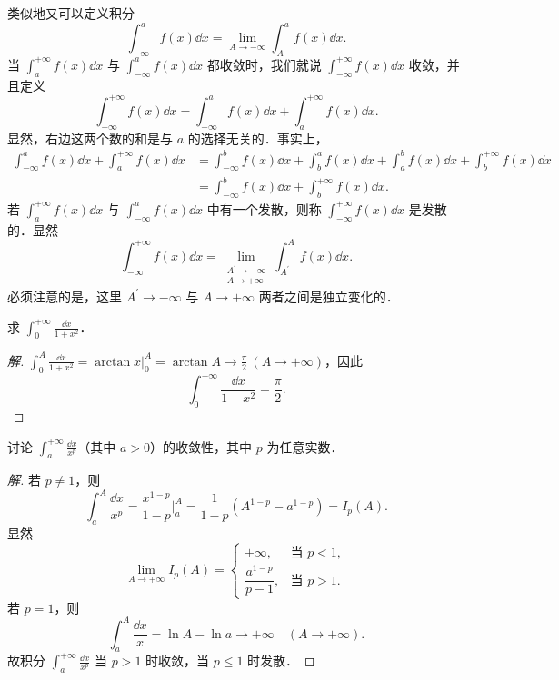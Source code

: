 类似地又可以定义积分
\[
\int_{-\infty}^{a}f(x)\dd x=\lim_{A\to-\infty}\int_{A}^{a}f(x)\dd x.
\]
当 $\displaystyle\int_{a}^{+\infty}f(x)\dd x$ 与 $\displaystyle\int_{-\infty}^{a}f(x)\dd x$ 都收敛时，我们就说 $\displaystyle\int_{-\infty}^{+\infty}f(x)\dd x$ 收敛，并且定义
\[
\int_{-\infty}^{+\infty}f(x)\dd x=\int_{-\infty}^{a}f(x)\dd x+\int_{a}^{+\infty}f(x)\dd x.
\]
显然，右边这两个数的和是与 $a$ 的选择无关的．事实上，
\[
\begin{aligned}
\int_{-\infty}^{a}f(x)\dd x+\int_{a}^{+\infty}f(x)\dd x
&=\int_{-\infty}^{b}f(x)\dd x+\int_{b}^{a}f(x)\dd x+\int_{a}^{b}f(x)\dd x+\int_{b}^{+\infty}f(x)\dd x\\
&=\int_{-\infty}^{b}f(x)\dd x+\int_{b}^{+\infty}f(x)\dd x.
\end{aligned}
\]
若 $\displaystyle\int_{a}^{+\infty}f(x)\dd x$ 与 $\displaystyle\int_{-\infty}^{a}f(x)\dd x$ 中有一个发散，则称 $\displaystyle\int_{-\infty}^{+\infty}f(x)\dd x$ 是发散的．显然
\[
\int_{-\infty}^{+\infty}f(x)\dd x=\lim_{\substack{A^{\prime}\to-\infty\\ A\to+\infty}}\int_{A^{\prime}}^{A}f(x)\dd x.
\]
必须注意的是，这里 $A^{\prime}\to-\infty$ 与 $A\to+\infty$ 两者之间是独立变化的．

\begin{example}\label{ex:11-1-1}
求 $\displaystyle\int_{0}^{+\infty}\frac{\dd x}{1+x^{2}}$．
\end{example}

\begin{proof}[解]
$\displaystyle\int_{0}^{A}\frac{\dd x}{1+x^{2}}=\arctan x\Big|_{0}^{A}=\arctan A\to\frac{\pi}{2}\ (A\to+\infty)$，因此
\[
\int_{0}^{+\infty}\frac{\dd x}{1+x^{2}}=\frac{\pi}{2}.
\]
\end{proof}

\begin{example}\label{ex:11-1-2}
讨论 $\displaystyle\int_{a}^{+\infty}\frac{\dd x}{x^{p}}$（其中 $a>0$）的收敛性，其中 $p$ 为任意实数．
\end{example}

\begin{proof}[解]
若 $p\neq 1$，则
\[
\int_{a}^{A}\frac{\dd x}{x^{p}}=\frac{x^{1-p}}{1-p}\bigg|_{a}^{A}=\frac{1}{1-p}\left(A^{1-p}-a^{1-p}\right)=I_{p}(A).
\]
显然
\[
\lim_{A\to+\infty}I_{p}(A)=\begin{cases}
+\infty, & \text{当 }p<1,\\[3pt]
\dfrac{a^{1-p}}{p-1}, & \text{当 }p>1.
\end{cases}
\]
若 $p=1$，则
\[
\int_{a}^{A}\frac{\dd x}{x}=\ln A-\ln a\to+\infty\quad(A\to+\infty).
\]
故积分 $\displaystyle\int_{a}^{+\infty}\frac{\dd x}{x^{p}}$ 当 $p>1$ 时收敛，当 $p\leqslant 1$ 时发散．
\end{proof}

